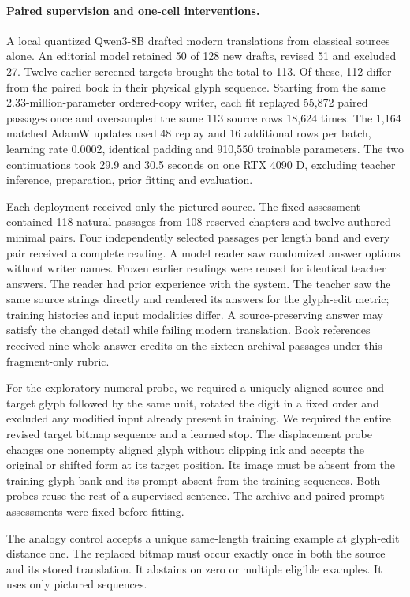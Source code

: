 \paragraph{Paired supervision and one-cell interventions.}
A local quantized Qwen3-8B drafted modern translations from classical sources alone. An editorial model retained 50 of 128 new drafts, revised 51 and excluded 27. Twelve earlier screened targets brought the total to 113. Of these, 112 differ from the paired book in their physical glyph sequence. Starting from the same 2.33-million-parameter ordered-copy writer, each fit replayed 55,872 paired passages once and oversampled the same 113 source rows 18,624 times. The 1,164 matched AdamW updates used 48 replay and 16 additional rows per batch, learning rate 0.0002, identical padding and 910,550 trainable parameters. The two continuations took 29.9 and 30.5 seconds on one RTX 4090 D, excluding teacher inference, preparation, prior fitting and evaluation.

Each deployment received only the pictured source. The fixed assessment contained 118 natural passages from 108 reserved chapters and twelve authored minimal pairs. Four independently selected passages per length band and every pair received a complete reading. A model reader saw randomized answer options without writer names. Frozen earlier readings were reused for identical teacher answers. The reader had prior experience with the system. The teacher saw the same source strings directly and rendered its answers for the glyph-edit metric; training histories and input modalities differ. A source-preserving answer may satisfy the changed detail while failing modern translation. Book references received nine whole-answer credits on the sixteen archival passages under this fragment-only rubric.

For the exploratory numeral probe, we required a uniquely aligned source and target glyph followed by the same unit, rotated the digit in a fixed order and excluded any modified input already present in training. We required the entire revised target bitmap sequence and a learned stop. The displacement probe changes one nonempty aligned glyph without clipping ink and accepts the original or shifted form at its target position. Its image must be absent from the training glyph bank and its prompt absent from the training sequences. Both probes reuse the rest of a supervised sentence. The archive and paired-prompt assessments were fixed before fitting.

The analogy control accepts a unique same-length training example at glyph-edit distance one. The replaced bitmap must occur exactly once in both the source and its stored translation. It abstains on zero or multiple eligible examples. It uses only pictured sequences.
